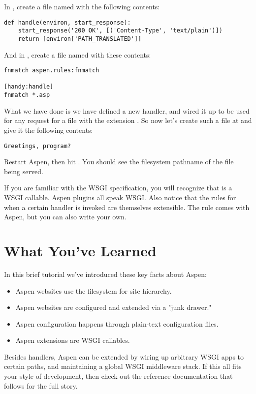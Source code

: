 In , create a file named  with the
following contents:

\begin{verbatim}
def handle(environ, start_response):
    start_response('200 OK', [('Content-Type', 'text/plain')])
    return [environ['PATH_TRANSLATED']]
\end{verbatim}

And in , create a file named  with these
contents:

\begin{verbatim}
fnmatch aspen.rules:fnmatch

[handy:handle]
fnmatch *.asp
\end{verbatim}

What we have done is we have defined a new handler, and wired it up to be used
for any request for a file with the extension . So now let's create
such a file at  and give it the following contents:

\begin{verbatim}
Greetings, program?
\end{verbatim}

Restart Aspen, then hit . You should see
the filesystem pathname of the file being served.

If you are familiar with the WSGI specification, you will recognize that
 is a WSGI callable. Aspen plugins all speak WSGI. Also
notice that the rules for when a certain handler is invoked are themselves
extensible. The  rule comes with Aspen, but you can also write
your own.


\section{What You've Learned \label{tutorial-learned}}

In this brief tutorial we've introduced these key facts about Aspen:

\begin{itemize}
\item{Aspen websites use the filesystem for site hierarchy.}
\item{Aspen websites are configured and extended via a "junk drawer."}
\item{Aspen configuration happens through plain-text configuration files.}
\item{Aspen extensions are WSGI callables.}
\end{itemize}

Besides handlers, Aspen can be extended by wiring up arbitrary WSGI apps to
certain paths, and maintaining a global WSGI middleware stack. If this all fits
your style of development, then check out the reference documentation that
follows for the full story.
